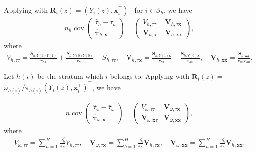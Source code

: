 \documentclass[12pt]{article}
\newcommand{\cov}{\operatorname{cov}}
\newcommand{\ms}{\mathcal{S}}
\newcommand{\bs}{\boldsymbol}
\begin{document}
Applying  with $\bs{R}_i(z)=(Y_i(z),\bs{x}_i^\top)^\top$ for $i \in \ms_h$, we have
\begin{align*}
    n_h \cov\begin{pmatrix}
        \hat{\tau}_h -\bar{\tau}_h\\
        \hat{\bs{\tau}}_{h,\bs{x}}
    \end{pmatrix}  = \begin{pmatrix}
            V_{h,\tau\tau}& \bs{V}_{h, \tau \bs{x}}\\
            \bs{V}_{h, \bs{x} \tau} & \bs{V}_{h, \bs{x}\bs{x}}
        \end{pmatrix},
\end{align*}
where
\begin{gather*}
   V_{h,\tau\tau}  = \frac{S_{h,Y(1)Y(1)}}{r_{h1}} + \frac{S_{h,Y(0)Y(0)}}{r_{h0}}-S_{h,\tau\tau},\quad
 \bs{V}_{h,\tau \bs{x}}  =  \frac{\bs{S}_{h,Y(1)\bs{x}}}{r_{h1}} + \frac{\bs{S}_{h,Y(0)\bs{x}}}{r_{h0}},\quad \bs{V}_{h,\bs{x}\bs{x}} =  \frac{\bs{S}_{h,\bs{x}\bs{x}}}{r_{h1}r_{h0}}.
\end{gather*}

Let $h(i)$ be the stratum which $i$ belongs to. Applying  with $\bs{R}_i(z)=$ $\omega_{h(i)}/\pi_{h(i)}(Y_i(z),\bs{x}_i^\top)^\top$, we have

\begin{align*}
    n \cov\begin{pmatrix}
        \hat{\tau}_{\omega} -\bar{\tau}_{\omega}\\
        \hat{\bs{\tau}}_{\omega,\bs{x}}
    \end{pmatrix}  = \begin{pmatrix}
            V_{\omega,\tau\tau}& \bs{V}_{\omega, \tau \bs{x}}\\
            \bs{V}_{\omega, \bs{x} \tau} & \bs{V}_{\omega, \bs{x}\bs{x}}
        \end{pmatrix},
\end{align*}
where
\begin{align*}
    V_{\omega,\tau\tau} = \sum_{h=1}^H 
    \frac{\omega_h^2}{\pi_{h}}{V}_{h,\tau\tau},\quad \bs{V}_{\omega, \tau \bs{x}} = \sum_{h=1}^H 
    \frac{\omega_h^2}{\pi_{h}}\bs{V}_{h,\tau \bs{x}},\quad
    \bs{V}_{\omega, \bs{x}\bs{x}} = \sum_{h=1}^H 
    \frac{\omega_h^2}{\pi_{h}}\bs{V}_{h,\bs{x}\bs{x}}.
\end{align*}
\end{document}
